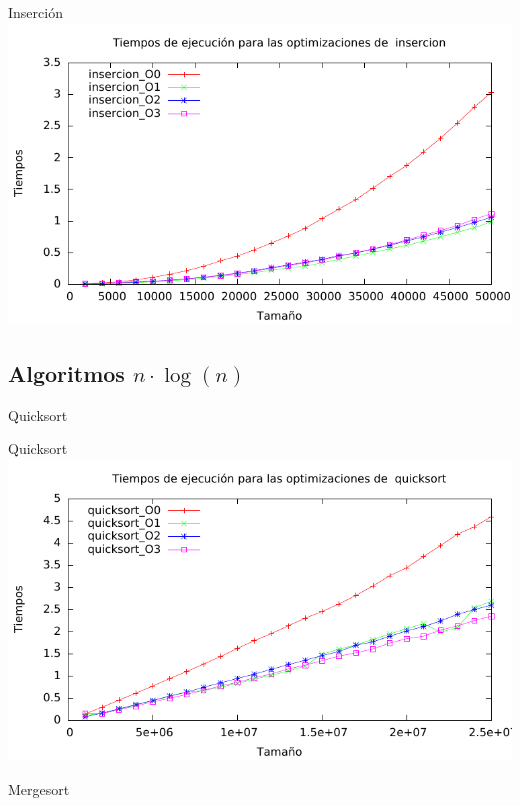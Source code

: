 \documentclass[10pt,compress,usetitleprogressbar,mathserif]{beamer}
\begin{document}
\begin{frame}{Inserción}
	\includegraphics[width = \textwidth ]{img/insercion_optim_g.pdf}
\end{frame}

\subsection{Algoritmos $n \cdot \log(n)$}

\begin{frame}{Quicksort}
	
\end{frame}

\begin{frame}{Quicksort}
	\includegraphics[width = \textwidth ]{img/quicksort_optim_g.pdf}
\end{frame}

\begin{frame}{Mergesort}
	
\end{frame}
\end{document}
